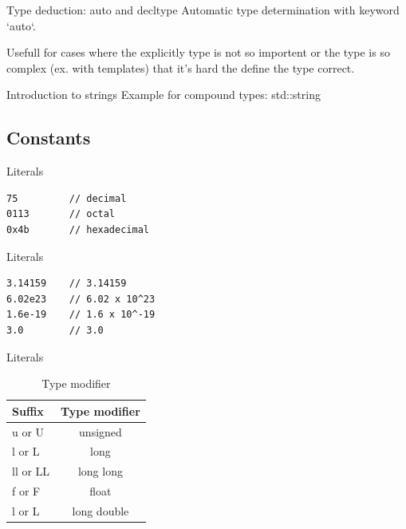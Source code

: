 \documentclass{beamer}
\begin{document}
\begin{frame}[fragile]{Type deduction: auto and decltype}
Automatic type determination with keyword `auto`.

Usefull for cases where the explicitly type is not so importent or the type is
so complex (ex. with templates) that it's hard the define the type correct.



\end{frame}

\begin{frame}{Introduction to strings}
Example for compound types: std::string



\end{frame}


\subsection{Constants}

\begin{frame}[fragile]{Literals}

\begin{lstlisting}[caption=Integer Numerals]
75         // decimal
0113       // octal
0x4b       // hexadecimal
\end{lstlisting}

\end{frame}

\begin{frame}[fragile]{Literals}

\begin{lstlisting}[caption=Floating Point Numerals]
3.14159    // 3.14159
6.02e23    // 6.02 x 10^23
1.6e-19    // 1.6 x 10^-19
3.0        // 3.0
\end{lstlisting}

\end{frame}

\begin{frame}{Literals}
\begin{table}
\begin{tabular}{l | c}
Suffix & Type modifier \\
\hline
u or U & unsigned \\
l or L & long \\
ll or LL & long long \\
f or F & float \\
l or L & long double
\end{tabular}
\caption{Type modifier}
\end{table}

\end{frame}
\end{document}
